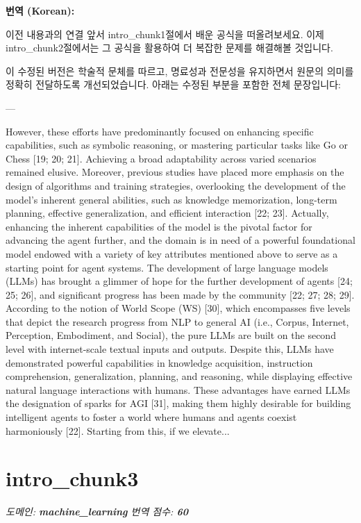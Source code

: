 \documentclass[12pt,a4paper]{article}
\begin{document}
\begin{mdframed}[style=ko]
\noindent\textbf{\small 번역 (Korean):}\\[2pt]
\begin{linkbox}{이전 내용과의 연결}
  앞서 intro_chunk1절에서 배운 공식을 떠올려보세요. 이제 intro_chunk2절에서는 그 공식을 활용하여 더 복잡한 문제를 해결해볼 것입니다.
\end{linkbox}
이 수정된 버전은 학술적 문체를 따르고, 명료성과 전문성을 유지하면서 원문의 의미를 정확히 전달하도록 개선되었습니다. 아래는 수정된 부분을 포함한 전체 문장입니다:

---

However, these efforts have predominantly focused on enhancing specific capabilities, such as symbolic reasoning, or mastering particular tasks like Go or Chess [19; 20; 21]. Achieving a broad adaptability across varied scenarios remained elusive. Moreover, previous studies have placed more emphasis on the design of algorithms and training strategies, overlooking the development of the model’s inherent general abilities, such as knowledge memorization, long-term planning, effective generalization, and efficient interaction [22; 23]. Actually, enhancing the inherent capabilities of the model is the pivotal factor for advancing the agent further, and the domain is in need of a powerful foundational model endowed with a variety of key attributes mentioned above to serve as a starting point for agent systems. The development of large language models (LLMs) has brought a glimmer of hope for the further development of agents [24; 25; 26], and significant progress has been made by the community [22; 27; 28; 29]. According to the notion of World Scope (WS) [30], which encompasses five levels that depict the research progress from NLP to general AI (i.e., Corpus, Internet, Perception, Embodiment, and Social), the pure LLMs are built on the second level with internet-scale textual inputs and outputs. Despite this, LLMs have demonstrated powerful capabilities in knowledge acquisition, instruction comprehension, generalization, planning, and reasoning, while displaying effective natural language interactions with humans. These advantages have earned LLMs the designation of sparks for AGI [31], making them highly desirable for building intelligent agents to foster a world where humans and agents coexist harmoniously [22]. Starting from this, if we elevate...
\end{mdframed}
\vspace{1em}

\section{intro\_chunk3}
\noindent\textit{\small 도메인: \textbf{machine\_learning} \quad 번역 점수: \textbf{\color{orange!80!black}60}}
\vspace{0.5em}
\end{document}
